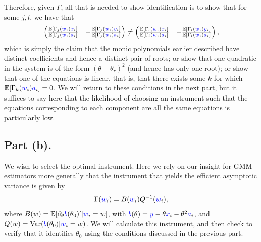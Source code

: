 \documentclass{article}
\renewcommand{\r}[1]{\textcolor{blue}{#1}}
\newcommand{\Var}{\mathrm{Var}}
\newcommand{\E}{\mathbb{E}}
\begin{document}
Therefore, given $\Gamma$, all that is needed to show identification is to show that for some $j,l$, we have that 
\begin{equation} \begin{pmatrix} \frac{\E[\Gamma_{j}(\r{w}_{i})\r{x}_{i}]}{\E[\Gamma_{j}(\r{w}_{i})\r{a}_{i}]} & -\frac{\E[\Gamma_{j}(\r{w}_{i})\r{y}_{i}]}{\E[\Gamma_{j}(\r{w}_{i})\r{a}_{i}]}\end{pmatrix} \neq \begin{pmatrix} \frac{\E[\Gamma_{l}(\r{w}_{i})\r{x}_{i}]}{\E[\Gamma_{l}(\r{w}_{i})\r{a}_{i}]} & -\frac{\E[\Gamma_{l}(\r{w}_{i})\r{y}_{i}]}{\E[\Gamma_{l}(\r{w}_{i})\r{a}_{i}]}\end{pmatrix},\end{equation}
which is simply the claim that the monic polynomials earlier described have distinct coefficients and hence a distinct pair of roots; or show that one quadratic in the system is of the form $(\theta-\theta_{r})^{2}$ (and hence has only one root); or show that one of the equations is linear, that is, that there exists some $k$ for which $\E[\Gamma_{k}(\r{w}_{i})\r{a}_{i}]=0$. We will return to these conditions in the next part, but it suffices to say here that the likelihood of choosing an instrument such that the equations corresponding to each component are all the same equations is particularly low.

\subsection{Part (b).}
We wish to select the optimal instrument. Here we rely on our insight for GMM estimators more generally that the instrument that yields the efficient asymptotic variance is given by
\begin{equation} \Gamma(\r{w}_{i}) = B(\r{w}_{i})Q^{-1}(\r{w}_{i}),\end{equation}
where $B(w)=\E[\partial_{\theta}\r{b}(\theta_{0})'|\r{w}_{i}=w]$, with $\r{b}(\theta)=\r{y}-\theta\r{x}_{i}-\theta^{2}\r{a}_{i}$, and $Q(w)=\Var(\r{b}(\theta_{0})|\r{w}_{i}=w)$. We will calculate this instrument, and then check to verify that it identifies $\theta_{0}$ using the conditions discussed in the previous part.
\end{document}

